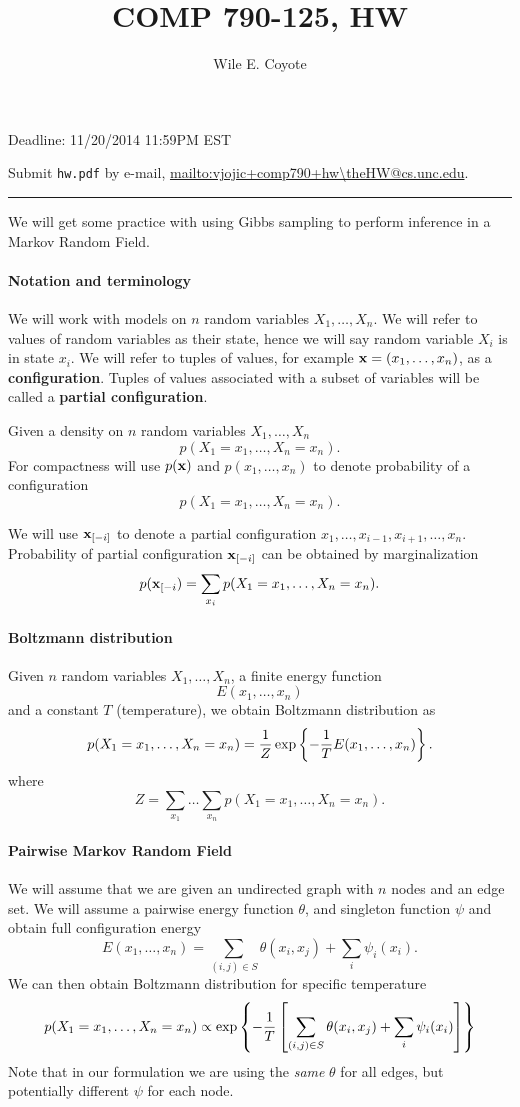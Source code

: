 \documentclass{article}
\begin{document}
\author{Wile E. Coyote}
\setcounter{HW}{3}
\title{COMP  790-125, HW\theHW}
\maketitle

{ Deadline: 11/20/2014 11:59PM EST}

{ Submit \texttt{hw\theHW.pdf} by e-mail,  \url{mailto:vjojic+comp790+hw\theHW@cs.unc.edu}}.


\noindent\rule{\textwidth}{3pt}
We will get some practice with using Gibbs sampling to perform inference in a Markov Random Field.

\paragraph{Notation and terminology} We will work with models on $n$ random variables $X_1,\dots,X_n$.
We will refer to values of random variables as their state, hence we will say random variable $X_i$ is in state $x_i$.
We will refer to tuples of values, for example $\mathbf{x} = (x_1,\dots,x_n)$,  as a {\bf configuration}.
Tuples of values associated with a subset of variables will be called a {\bf partial configuration}.

Given a density on $n$ random variables $X_1,\dots,X_n$
\[
p(X_1 = x_1,\dots,X_n = x_n).
\]
For compactness will use $p(\mathbf{x})$ and $p(x_1,\dots,x_n)$ to denote probability of a configuration
\[
p(X_1 = x_1,\dots,X_n = x_n).
\]

We will use $\mathbf{x}_{[-i]}$ to denote a partial configuration $x_1,\dots,x_{i-1},x_{i+1},\dots,x_n$.
Probability of partial configuration $\mathbf{x}_{[-i]}$ can be obtained by marginalization
\[
p(\mathbf{x}_{[-i}) = \sum_{x_i} p(X_1 = x_1,\dots,X_n = x_n).
\]


\paragraph{Boltzmann distribution} Given $n$ random variables $X_1,\dots,X_n$, a finite energy function
\[
E(x_1,\dots,x_n)
\]
and a constant $T$ (temperature), we obtain Boltzmann distribution as
\[
p(X_1 = x_1,\dots,X_n = x_n) = \frac{1}{Z} \mathop{\rm exp}\left\{-\frac{1}{T} E(x_1,\dots,x_n)\right\}.
\]
where
\[
Z = \sum_{x_1}\dots\sum_{x_n} p(X_1 = x_1,\dots,X_n = x_n).
\]

\paragraph{Pairwise Markov Random Field} We will assume that we are given an undirected graph with $n$ nodes and an edge set.
We will assume a pairwise energy function $\theta$, and singleton function $\psi$ and obtain full configuration energy
\[
E(x_1,\dots,x_n) = \sum_{(i,j) \in  S} \theta(x_i,x_j) + \sum_i \psi_i(x_i).
\]
We can then obtain Boltzmann distribution for specific temperature
\[
p(X_1 = x_1,\dots,X_n = x_n) \propto \mathop{\rm exp}\left\{-\frac{1}{T}\left[ \sum_{(i,j) \in  S} \theta(x_i,x_j) + \sum_i \psi_i(x_i)\right]\right\}
\]
Note that in our formulation we are using the {\em same} $\theta$ for all edges, but potentially different $\psi$ for each node.
\end{document}
